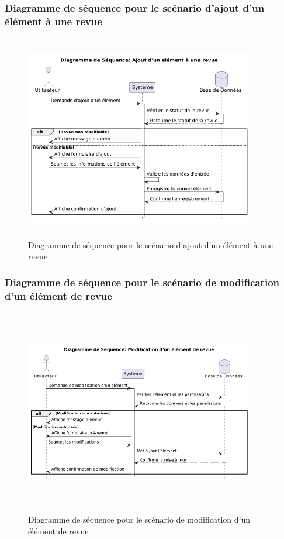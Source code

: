 \subsubsection{Diagramme de séquence pour le scénario d'ajout d'un élément à une revue}
\begin{figure}[H]
    \centering
    \includegraphics[width=10cm,height=9cm]{images/addelementrevueseq.png}
    \caption{Diagramme de séquence pour le scénario d'ajout d'un élément à une revue}
\end{figure}

\subsubsection{Diagramme de séquence pour le scénario de modification d'un élément de revue}
\begin{figure}[H]
    \centering
    \includegraphics[width=10cm,height=9cm]{images/modifyelementrevueseq.png}
    \caption{Diagramme de séquence pour le scénario de modification d'un élément de revue}
\end{figure}

